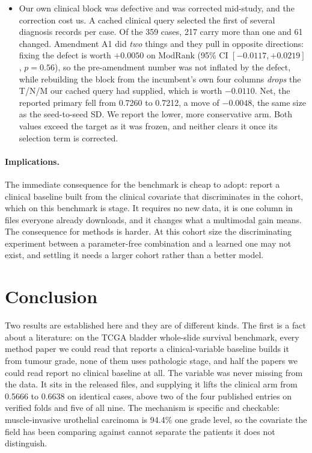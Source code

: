 \documentclass[unnumsec,webpdf,contemporary,large]{oup-authoring-template}
\begin{document}
\begin{itemize}
  \item Our own clinical block was defective and was corrected mid-study, and the
    correction cost us. A cached clinical query selected the first of several diagnosis records per case. Of the 359 cases, 217 carry more than one and 61 changed. Amendment A1 did \emph{two}
    things and they pull in opposite directions: fixing the defect is worth $+0.0050$ on ModRank (95\% CI $[-0.0117,+0.0219]$, $p=0.56$), so the pre-amendment number was not inflated by the defect, while rebuilding the block from the incumbent's own four columns \emph{drops}
    the T/N/M our cached query had supplied, which is worth $-0.0110$. Net, the reported
    primary fell from 0.7260 to 0.7212, a move of $-0.0048$, the same size as the seed-to-seed SD.
    We report the lower, more conservative arm. Both values exceed the target as it was frozen,
    and neither clears it once its selection term is corrected.
\end{itemize}

\paragraph{Implications.} The immediate consequence for the benchmark is cheap to adopt: report a
clinical baseline built from the clinical covariate that discriminates in the cohort, which on this
benchmark is stage. It requires no new data, it is one column in files everyone
already downloads, and it changes what a multimodal gain means. The consequence for methods is
harder. At this cohort size the discriminating experiment between a parameter-free combination
and a learned one may not exist, and settling it needs a larger cohort rather than a better model.


\section{Conclusion}

Two results are established here and they are of different kinds. The first is a fact about a
literature: on the TCGA bladder whole-slide survival benchmark, every method paper we could read
that reports a clinical-variable baseline builds it from tumour grade, none of them uses pathologic
stage, and half the papers we could read report no clinical baseline at all. The variable was never missing from the
data. It sits in the released files, and supplying it lifts the clinical arm from 0.5666 to 0.6638
on identical cases, above two of the four published entries on verified folds and five of all
nine. The mechanism is specific and
checkable: muscle-invasive urothelial carcinoma is 94.4\% one grade level, so the covariate the
field has been comparing against cannot separate the patients it does not distinguish.
\end{document}
